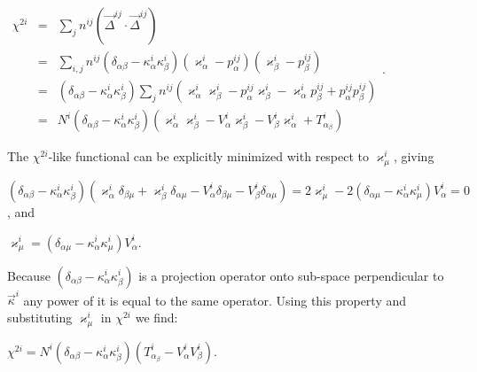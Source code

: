 \documentclass[letterpaper]{article}
\begin{document}
$\displaystyle \begin{array}{lll}
\chi^{2i} & = & 
\sum\limits_{j}n^{ij}\left(\vec{\Delta}^{ij}\cdot\vec{\Delta}^{ij}\right) \\
& = & \sum\limits_{i,j}n^{ij}
\left(\delta_{\alpha \beta }-\kappa_{\alpha}^{i}\kappa_{\beta }^{i}\right) 
\left(\varkappa_{\alpha}^{i}-p_{\alpha}^{ij}\right)
\left(\varkappa_{\beta }^{i}-p_{\beta}^{ij}\right) \\
& = & \left(\delta_{\alpha\beta }-\kappa_{\alpha}^{i}\kappa_{\beta}^{i}\right)
\sum\limits_{j}n^{ij}\left(\varkappa_{\alpha}^{i}\varkappa_{\beta }^{i}
-p_{\alpha}^{ij}\varkappa_{\beta}^{i}-\varkappa_{\alpha}^{i}p_{\beta}^{ij}
+p_{\alpha }^{ij}p_{\beta}^{ij}\right) \\
& = & N^{i}\left(\delta_{\alpha\beta}
-\kappa_{\alpha}^{i}\kappa_{\beta}^{i}\right)
\left(\varkappa_{\alpha }^{i}\varkappa_{\beta}^{i}
-V_{\alpha}^{i}\varkappa_{\beta }^{i}
-V_{\beta}^{i}\varkappa_{\alpha}^{i}+T_{\alpha_{\beta}}^{i}\right)
\end{array}$.

The $\chi^{2i}$-like functional can be explicitly minimized with respect to
$\varkappa _{\mu }^{i}$, giving

$\displaystyle \left(\delta_{\alpha\beta}
-\kappa_{\alpha}^{i}\kappa_{\beta}^{i}\right)
\left(\varkappa_{\alpha }^{i}\delta_{\beta \mu }
+\varkappa_{\beta}^{i}\delta_{\alpha\mu }-V_{\alpha}^{i}\delta_{\beta\mu}
-V_{\beta}^{i}\delta_{\alpha\mu}\right)
=2\varkappa_{\mu}^{i}-2\left(\delta_{\alpha\mu}
-\kappa_{\alpha}^{i}\kappa_{\mu }^{i}\right)
V_{\alpha }^{i}=0$, and

$\varkappa_{\mu}^{i}=\left(\delta_{\alpha\mu}
-\kappa_{\alpha}^{i}\kappa_{\mu}^{i}\right)V_{\alpha}^{i}$.

Because
$\left(\delta_{\alpha\beta}-\kappa_{\alpha}^{i}\kappa_{\beta}^{i}\right)$
is a projection operator onto sub-space perpendicular to
$\vec{\kappa}^{i}$ any power of it is equal to the same operator. 
Using this property and substituting $\varkappa _{\mu }^{i}$ in $\chi
^{2i}$ we find:

$\displaystyle \chi^{2i}
=N^{i}\left(\delta_{\alpha\beta}-\kappa_{\alpha}^{i}\kappa_{\beta}^{i}\right)
\left(T_{\alpha_{\beta}}^{i}-V_{\alpha}^{i}V_{\beta}^{i}\right)$.
\end{document}
